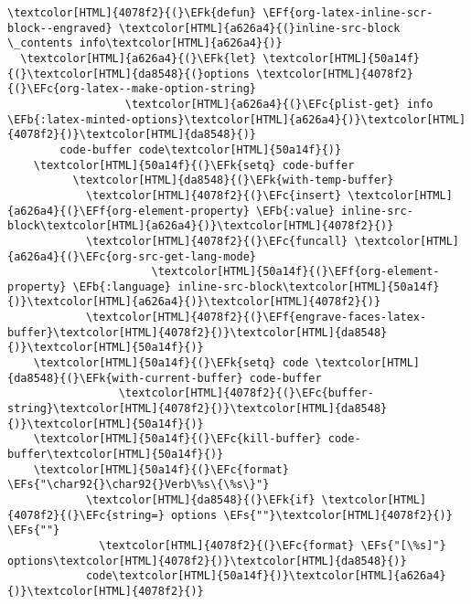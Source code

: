 \documentclass{scrartcl}
\newcommand{\EFk}[1]{\textcolor{EFk}{#1}} %
\newcommand{\EFs}[1]{\textcolor{EFs}{#1}} %
\newcommand{\EFb}[1]{\textcolor{EFb}{#1}} %
\newcommand{\EFc}[1]{\textcolor{EFc}{#1}} %
\newcommand{\EFf}[1]{\textcolor{EFf}{#1}} %
\begin{document}
\begin{enumerate}
\begin{Code}
\begin{Verbatim}[]
\textcolor[HTML]{4078f2}{(}\EFk{defun} \EFf{org-latex-inline-scr-block--engraved} \textcolor[HTML]{a626a4}{(}inline-src-block \_contents info\textcolor[HTML]{a626a4}{)}
  \textcolor[HTML]{a626a4}{(}\EFk{let} \textcolor[HTML]{50a14f}{(}\textcolor[HTML]{da8548}{(}options \textcolor[HTML]{4078f2}{(}\EFc{org-latex--make-option-string}
                  \textcolor[HTML]{a626a4}{(}\EFc{plist-get} info \EFb{:latex-minted-options}\textcolor[HTML]{a626a4}{)}\textcolor[HTML]{4078f2}{)}\textcolor[HTML]{da8548}{)}
        code-buffer code\textcolor[HTML]{50a14f}{)}
    \textcolor[HTML]{50a14f}{(}\EFk{setq} code-buffer
          \textcolor[HTML]{da8548}{(}\EFk{with-temp-buffer}
            \textcolor[HTML]{4078f2}{(}\EFc{insert} \textcolor[HTML]{a626a4}{(}\EFf{org-element-property} \EFb{:value} inline-src-block\textcolor[HTML]{a626a4}{)}\textcolor[HTML]{4078f2}{)}
            \textcolor[HTML]{4078f2}{(}\EFc{funcall} \textcolor[HTML]{a626a4}{(}\EFc{org-src-get-lang-mode}
                      \textcolor[HTML]{50a14f}{(}\EFf{org-element-property} \EFb{:language} inline-src-block\textcolor[HTML]{50a14f}{)}\textcolor[HTML]{a626a4}{)}\textcolor[HTML]{4078f2}{)}
            \textcolor[HTML]{4078f2}{(}\EFf{engrave-faces-latex-buffer}\textcolor[HTML]{4078f2}{)}\textcolor[HTML]{da8548}{)}\textcolor[HTML]{50a14f}{)}
    \textcolor[HTML]{50a14f}{(}\EFk{setq} code \textcolor[HTML]{da8548}{(}\EFk{with-current-buffer} code-buffer
                 \textcolor[HTML]{4078f2}{(}\EFc{buffer-string}\textcolor[HTML]{4078f2}{)}\textcolor[HTML]{da8548}{)}\textcolor[HTML]{50a14f}{)}
    \textcolor[HTML]{50a14f}{(}\EFc{kill-buffer} code-buffer\textcolor[HTML]{50a14f}{)}
    \textcolor[HTML]{50a14f}{(}\EFc{format} \EFs{"\char92{}\char92{}Verb\%s\{\%s\}"}
            \textcolor[HTML]{da8548}{(}\EFk{if} \textcolor[HTML]{4078f2}{(}\EFc{string=} options \EFs{""}\textcolor[HTML]{4078f2}{)} \EFs{""}
              \textcolor[HTML]{4078f2}{(}\EFc{format} \EFs{"[\%s]"} options\textcolor[HTML]{4078f2}{)}\textcolor[HTML]{da8548}{)}
            code\textcolor[HTML]{50a14f}{)}\textcolor[HTML]{a626a4}{)}\textcolor[HTML]{4078f2}{)}


\end{Verbatim}
\end{Code}
\end{enumerate}
\end{document}
